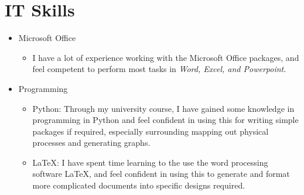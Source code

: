 \documentclass[10pt, a4paper]{article}
\begin{document}
\section{IT Skills}
\begin{itemize}
	\item Microsoft Office
	\begin{itemize}
		\item I have a lot of experience working with the Microsoft Office packages, and feel competent to perform most tasks in \textit{Word, Excel, and Powerpoint}.
	\end{itemize}
	\item Programming
	\begin{itemize}
		\item Python: Through my university course, I have gained some knowledge in programming in Python and feel confident in using this for writing simple packages if required, especially surrounding mapping out physical processes and generating graphs.
		\item \LaTeX: I have spent time learning to the use the word processing software \LaTeX, and feel confident in using this to generate and format more complicated documents into specific designs required.
	\end{itemize}
\end{itemize}

\end{document}
